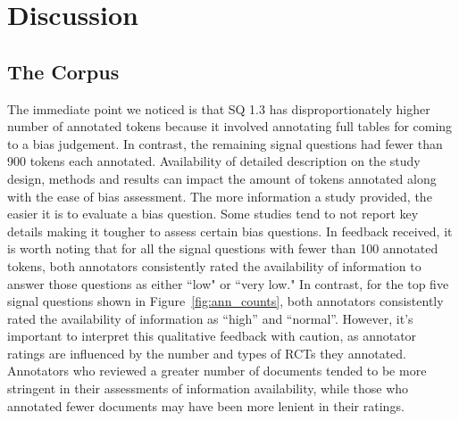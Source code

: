 \documentclass[sn-mathphys,Numbered]{sn-jnl}%
\theoremstyle{thmstyleone}%
\theoremstyle{thmstyletwo}%
\theoremstyle{thmstylethree}%
\begin{document}
\section{Discussion}
\label{sec:discussion}
%
%
%
\subsection{The Corpus}
\label{disc:corpus}
%
The immediate point we noticed is that SQ 1.3 has disproportionately higher number of annotated tokens because it involved annotating full tables for coming to a bias judgement.
In contrast, the remaining signal questions had fewer than 900 tokens each annotated.
Availability of detailed description on the study design, methods and results can impact the amount of tokens annotated along with the ease of bias assessment.
The more information a study provided, the easier it is to evaluate a bias question.
Some studies tend to not report key details making it tougher to assess certain bias questions.
In feedback received, it is worth noting that for all the signal questions with fewer than 100 annotated tokens, both annotators consistently rated the availability of information to answer those questions as either ``low" or ``very low."
In contrast, for the top five signal questions shown in Figure~\ref{fig:ann_counts}, both annotators consistently rated the availability of information as ``high'' and ``normal''.
However, it's important to interpret this qualitative feedback with caution, as annotator ratings are influenced by the number and types of RCTs they annotated.
Annotators who reviewed a greater number of documents tended to be more stringent in their assessments of information availability, while those who annotated fewer documents may have been more lenient in their ratings.
%
%
%
\end{document}
